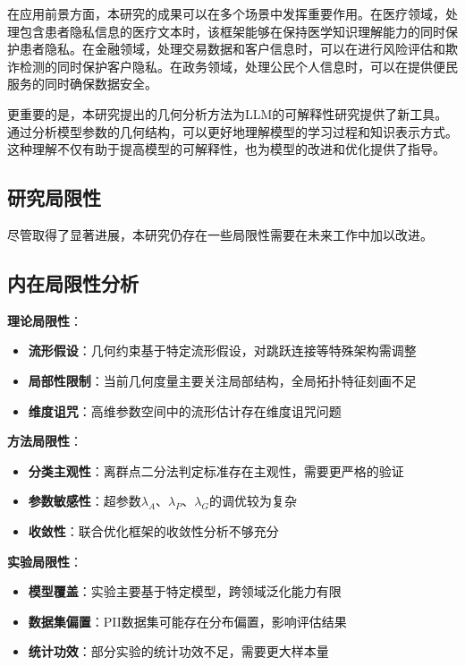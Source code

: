 在应用前景方面，本研究的成果可以在多个场景中发挥重要作用。在医疗领域，处理包含患者隐私信息的医疗文本时，该框架能够在保持医学知识理解能力的同时保护患者隐私。在金融领域，处理交易数据和客户信息时，可以在进行风险评估和欺诈检测的同时保护客户隐私。在政务领域，处理公民个人信息时，可以在提供便民服务的同时确保数据安全。

更重要的是，本研究提出的几何分析方法为LLM的可解释性研究提供了新工具。通过分析模型参数的几何结构，可以更好地理解模型的学习过程和知识表示方式。这种理解不仅有助于提高模型的可解释性，也为模型的改进和优化提供了指导。

\subsection{研究局限性}

尽管取得了显著进展，本研究仍存在一些局限性需要在未来工作中加以改进。

\subsection{内在局限性分析}

\textbf{理论局限性}：
\begin{itemize}
\item \textbf{流形假设}：几何约束基于特定流形假设，对跳跃连接等特殊架构需调整
\item \textbf{局部性限制}：当前几何度量主要关注局部结构，全局拓扑特征刻画不足
\item \textbf{维度诅咒}：高维参数空间中的流形估计存在维度诅咒问题
\end{itemize}

\textbf{方法局限性}：
\begin{itemize}
\item \textbf{分类主观性}：离群点二分法判定标准存在主观性，需要更严格的验证
\item \textbf{参数敏感性}：超参数$\lambda_A$、$\lambda_P$、$\lambda_G$的调优较为复杂
\item \textbf{收敛性}：联合优化框架的收敛性分析不够充分
\end{itemize}

\textbf{实验局限性}：
\begin{itemize}
\item \textbf{模型覆盖}：实验主要基于特定模型，跨领域泛化能力有限
\item \textbf{数据集偏置}：PII数据集可能存在分布偏置，影响评估结果
\item \textbf{统计功效}：部分实验的统计功效不足，需要更大样本量
\end{itemize}

